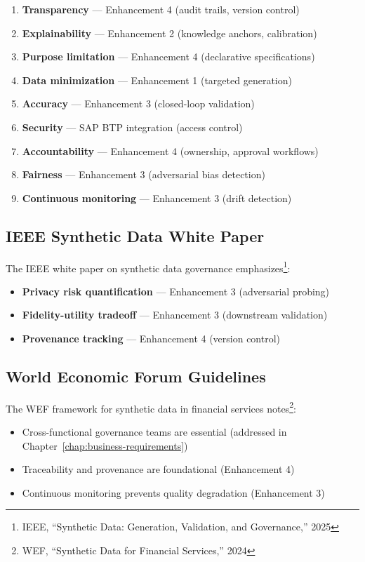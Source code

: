 \documentclass[12pt,a4paper,twoside]{report}
\begin{document}
\begin{enumerate}
\item \textbf{Transparency} --- Enhancement 4 (audit trails, version control)
\item \textbf{Explainability} --- Enhancement 2 (knowledge anchors, calibration)
\item \textbf{Purpose limitation} --- Enhancement 4 (declarative specifications)
\item \textbf{Data minimization} --- Enhancement 1 (targeted generation)
\item \textbf{Accuracy} --- Enhancement 3 (closed-loop validation)
\item \textbf{Security} --- SAP BTP integration (access control)
\item \textbf{Accountability} --- Enhancement 4 (ownership, approval workflows)
\item \textbf{Fairness} --- Enhancement 3 (adversarial bias detection)
\item \textbf{Continuous monitoring} --- Enhancement 3 (drift detection)
\end{enumerate}

\subsection{IEEE Synthetic Data White Paper}

The IEEE white paper on synthetic data governance emphasizes\footnote{IEEE,
``Synthetic Data: Generation, Validation, and Governance,'' 2025}:

\begin{itemize}
\item \textbf{Privacy risk quantification} --- Enhancement 3 (adversarial probing)
\item \textbf{Fidelity-utility tradeoff} --- Enhancement 3 (downstream validation)
\item \textbf{Provenance tracking} --- Enhancement 4 (version control)
\end{itemize}

\subsection{World Economic Forum Guidelines}

The WEF framework for synthetic data in financial services notes\footnote{WEF,
``Synthetic Data for Financial Services,'' 2024}:

\begin{itemize}
\item Cross-functional governance teams are essential (addressed in Chapter~\ref{chap:business-requirements})
\item Traceability and provenance are foundational (Enhancement 4)
\item Continuous monitoring prevents quality degradation (Enhancement 3)
\end{itemize}
\end{document}
